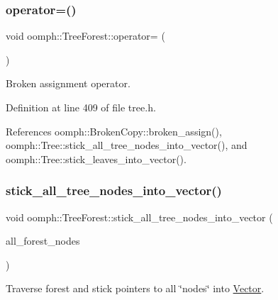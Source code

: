 \subsubsection{\texorpdfstring{operator=()}{operator=()}}
{\footnotesize\ttfamily void oomph\+::\+Tree\+Forest\+::operator= (\begin{DoxyParamCaption}\item[{const \hyperlink{classoomph_1_1TreeForest}{Tree\+Forest} \&}]{ }\end{DoxyParamCaption})\hspace{0.3cm}{\ttfamily [inline]}}



Broken assignment operator. 



Definition at line 409 of file tree.\+h.



References oomph\+::\+Broken\+Copy\+::broken\+\_\+assign(), oomph\+::\+Tree\+::stick\+\_\+all\+\_\+tree\+\_\+nodes\+\_\+into\+\_\+vector(), and oomph\+::\+Tree\+::stick\+\_\+leaves\+\_\+into\+\_\+vector().

\mbox{\label{classoomph_1_1TreeForest_a40bd3735303f019892b03d6a5355c8db}} 
\subsubsection{\texorpdfstring{stick\+\_\+all\+\_\+tree\+\_\+nodes\+\_\+into\+\_\+vector()}{stick\_all\_tree\_nodes\_into\_vector()}}
{\footnotesize\ttfamily void oomph\+::\+Tree\+Forest\+::stick\+\_\+all\+\_\+tree\+\_\+nodes\+\_\+into\+\_\+vector (\begin{DoxyParamCaption}\item[{\hyperlink{classoomph_1_1Vector}{Vector}$<$ \hyperlink{classoomph_1_1Tree}{Tree} $\ast$ $>$ \&}]{all\+\_\+forest\+\_\+nodes }\end{DoxyParamCaption})}



Traverse forest and stick pointers to all \char`\"{}nodes\char`\"{} into \hyperlink{classoomph_1_1Vector}{Vector}. 

